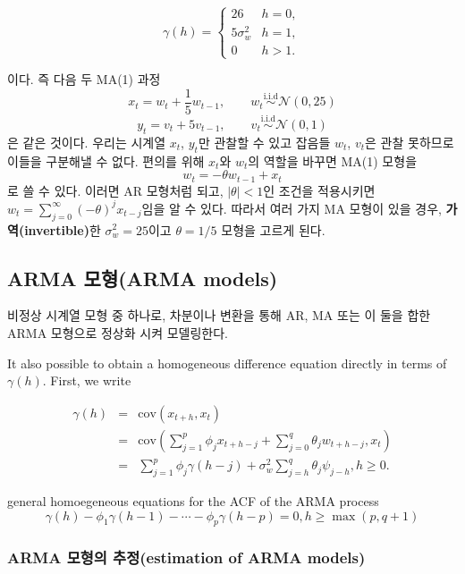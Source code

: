 \documentclass[b5paper,]{scrbook}
\theoremstyle{plain}
\theoremstyle{definition}
\numberwithin{equation}{section}
\begin{document}
\[
\gamma(h) = 
\begin{cases}
26 & h=0,\\
5 \sigma_{w}^{2} & h=1,\\
0 & h>1.
\end{cases}
\]

이다. 즉 다음 두 MA(1) 과정
\[x_{t}=w_{t}+\frac{1}{5}w_{t-1}, \qquad{w_{t}\stackrel{\text{i.i.d}}{\sim}\mathcal{N}(0,25)}\]
\[y_{t}=v_{t}+5v_{t-1}, \qquad{v_{t}\stackrel{\text{i.i.d}}{\sim}\mathcal{N}(0,1)}\]
은 같은 것이다. 우리는 시계열 \(x_{t}\), \(y_{t}\)만 관찰할 수 있고 잡음들 \(w_{t}\), \(v_{t}\)은 관찰 못하므로 이들을 구분해낼 수 없다. 편의를 위해 \(x_{t}\)와 \(w_{t}\)의 역할을 바꾸면 MA(1) 모형을
\[w_{t}=-\theta w_{t-1}+x_{t}\]
로 쓸 수 있다. 이러면 AR 모형처럼 되고, \(|\theta|<1\)인 조건을 적용시키면 \(w_{t}=\sum_{j=0}^{\infty}(-\theta)^{j}x_{t-j}\)임을 알 수 있다. 따라서 여러 가지 MA 모형이 있을 경우, \textbf{가역(invertible)}한 \(\sigma_{w}^{2}=25\)이고 \(\theta=1/5\) 모형을 고르게 된다.

\hypertarget{arma-arma-models}{%
\subsection{ARMA 모형(ARMA models)}\label{arma-arma-models}}

비정상 시계열 모형 중 하나로, 차분이나 변환을 통해 AR, MA 또는 이 둘을 합한 ARMA 모형으로 정상화 시켜 모델링한다.

It also possible to obtain a homogeneous difference equation directly in terms of \(\gamma(h)\). First, we write

\[
\begin{eqnarray}
\gamma(h)&=&\text{cov}(x_{t+h},x_{t})\\
&=&\text{cov}(\sum_{j=1}^{p}\phi_{j}x_{t+h-j}+\sum_{j=0}^{q}\theta_{j}w_{t+h-j},x_{t})\\
&=&\sum_{j=1}^{p}\phi_{j}\gamma(h-j)+\sigma_{w}^{2}\sum_{j=h}^{q}\theta_{j}\psi_{j-h}, h \geq 0.
\end{eqnarray}
\]

general homoegeneous equations for the ACF of the ARMA process
\[\gamma(h)-\phi_{1}\gamma(h-1)-\cdots - \phi_{p}\gamma(h-p)=0, h\geq \max(p,q+1)\]

\hypertarget{arma--estimation-of-arma-models}{%
\subsubsection{ARMA 모형의 추정(estimation of ARMA models)}\label{arma--estimation-of-arma-models}}
\end{document}
